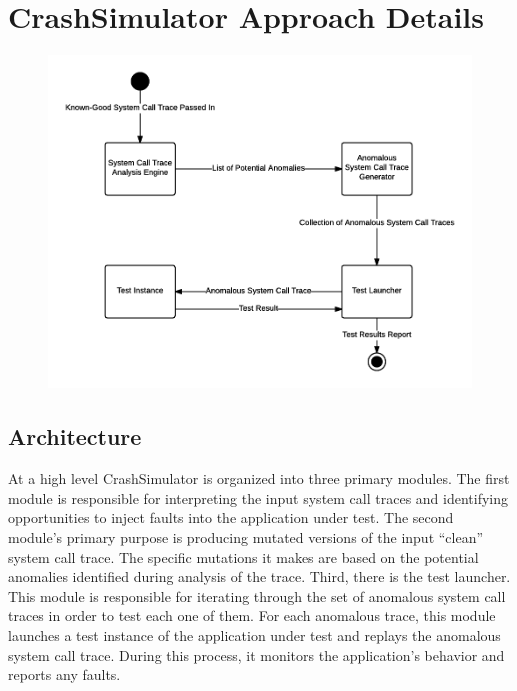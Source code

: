\section{CrashSimulator Approach Details}

    \begin{figure}[h]
        \center{}
        \includegraphics[scale=.5]{Architecture}
    \end{figure}

    \subsection{Architecture}

        At a high level CrashSimulator is organized into three primary modules. The first module is responsible for
        interpreting the input system call traces and identifying opportunities to inject faults into the application
        under test. The second module's primary purpose is producing mutated versions of the input ``clean'' system call
        trace. The specific mutations it makes are based on the potential anomalies identified during analysis of the
        trace. Third, there is the test launcher. This module is responsible for iterating through the set of anomalous
        system call traces in order to test each one of them. For each anomalous trace, this module launches a test
        instance of the application under test and replays the anomalous system call trace. During this process, it
        monitors the application's behavior and reports any faults.

